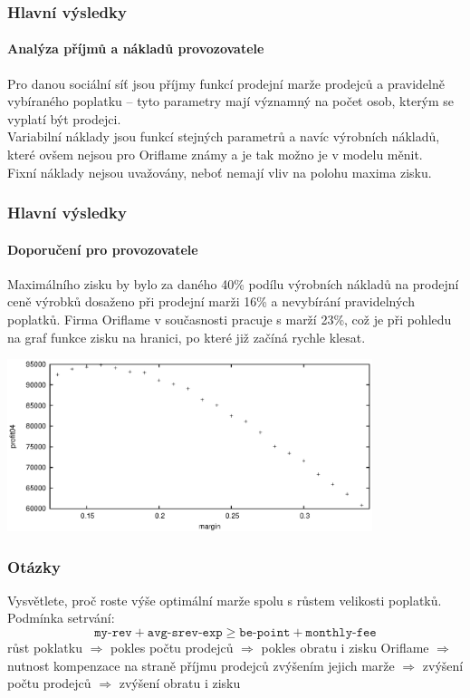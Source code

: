 \documentclass[xcolor=dvipsnames]{beamer}
\begin{document}
  \begin{frame}
    \frametitle{Hlavní výsledky}
    \framesubtitle{Analýza příjmů a nákladů provozovatele}
    Pro danou sociální síť jsou příjmy funkcí prodejní marže prodejců a pravidelně vybíraného poplatku -- tyto parametry mají významný na počet osob, kterým se vyplatí být prodejci.\\
    Variabilní náklady jsou funkcí stejných parametrů a navíc výrobních nákladů, které ovšem nejsou pro Oriflame známy a je tak možno je v modelu měnit.\\
    Fixní náklady nejsou uvažovány, neboť nemají vliv na polohu maxima zisku.\\
  \end{frame}
  \begin{frame}
    \frametitle{Hlavní výsledky}
    \framesubtitle{Doporučení pro provozovatele}
    Maximálního zisku by bylo za daného 40\% podílu výrobních nákladů na prodejní ceně výrobků dosaženo při prodejní marži 16\% a nevybírání pravidelných poplatků. Firma Oriflame v současnosti pracuje s marží 23\%, což je při pohledu na graf funkce zisku na hranici, po které již začíná rychle klesat.\\
    \begin{center}\includegraphics[width=0.8\textwidth]{max-profit-04-f0.eps}\end{center}
  \end{frame}
  \begin{frame}
    \frametitle{Otázky}
    Vysvětlete, proč roste výše optimální marže spolu s růstem velikosti poplatků.\\[1cm]
    Podmínka setrvání:
    \[ \texttt{my-rev} + \texttt{avg-srev-exp} \geq \texttt{be-point} + \texttt{monthly-fee} \]
    růst poklatku $\Rightarrow$ pokles počtu prodejců $\Rightarrow$ pokles obratu i zisku Oriflame $\Rightarrow$ nutnost kompenzace na straně příjmu prodejců zvýšením jejich marže $\Rightarrow$ zvýšení počtu prodejců $\Rightarrow$ zvýšení obratu i zisku
  \end{frame}
\end{document}
